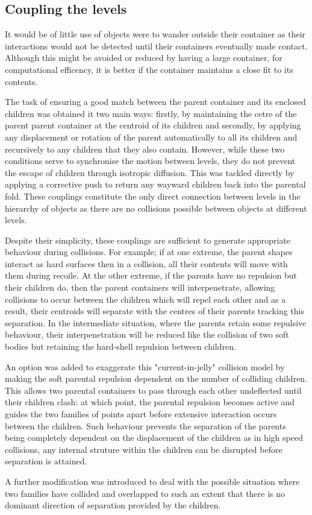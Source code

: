 \subsection{Coupling the levels}

It would be of little use of objects were to wander outside their container as their
interactions would not be detected until their containers eventually made contact.
Although this might be avoided or reduced by having a large container, for computational
efficency, it is better if the container maintains a close fit to its contents.

The task of ensuring a good match between the parent container and its enclosed
children was obtained it two main ways: firstly, by maintaining the cetre of the
parent parent container at the centroid of its children and secondly, by applying any
displacement or rotation of the parent automatically to all its children and recursively
to any children that they also contain.   However, while these two conditions serve
to synchronise the motion between levels, they do not prevent the escape of children
through isotropic diffusion.   This was tackled directly by applying a corrective
push to return any wayward children back into the parental fold.
These couplings constitute the only direct connection between levels in the hierarchy
of objects as there are no collisions possible between objects at different levels.

Despite their simplicity, these couplings are sufficient to generate appropriate
behaviour during collisions.   For example; if at one extreme, the parent shapes interact
as hard surfaces then in a collision, all their contents will move with them during
recoile.   At the other extreme, if the parents have no repulsion but their children do,
then the parent containers will interpenetrate, allowing collisions to occur between
the children which will repel each other and as a result, their centroids will 
separate with the centres of their parents tracking this separation.   In the intermediate
situation, where the parents retain some repulsive behaviour, their interpenetration
will be reduced like the collision of two soft bodies but retaining the hard-shell
repulsion between children.   

An option was added to exaggerate this "current-in-jelly" collision model by making
the soft parental repulsion dependent on the number of colliding children.   This
allows two parental containers to pass through each other undeflected until their
children clash: at which point, the parental repulsion becomes active and guides the
two families of points apart before extensive interaction occurs between the 
children.   Such behaviour prevents the separation of the parents being completely
dependent on the displacement of the children as in high speed collisions, any
internal struture within the children can be disrupted before separation is attained.

A further modification was introduced to deal with the possible situation where
two families have collided and overlapped to such an extent that there is no
dominant direction of separation provided by the children. 
